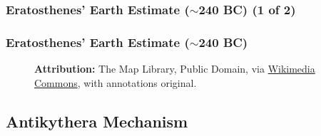 \begin{frame}
    \frametitle{Eratosthenes' Earth Estimate ($\sim$240 BC) (1 of 2)}

    \begin{figure}
        \centering
        \resizebox{0.5\linewidth}{!}{
            
        }
    \end{figure}

            
            
\end{frame}

\begin{frame}
    \frametitle{Eratosthenes' Earth Estimate ($\sim$240 BC)}

    \begin{figure}
        \centering
        \resizebox{0.5\linewidth}{!}{
            
        }

        \vspace{0.5em}

        {\tiny \textbf{Attribution:} The Map Library, Public Domain, via \href{https://commons.wikimedia.org/wiki/File:Egypt_sat.png}{Wikimedia Commons}, with annotations original.\par}
    \end{figure}
\end{frame}

\subsection{Antikythera Mechanism}

